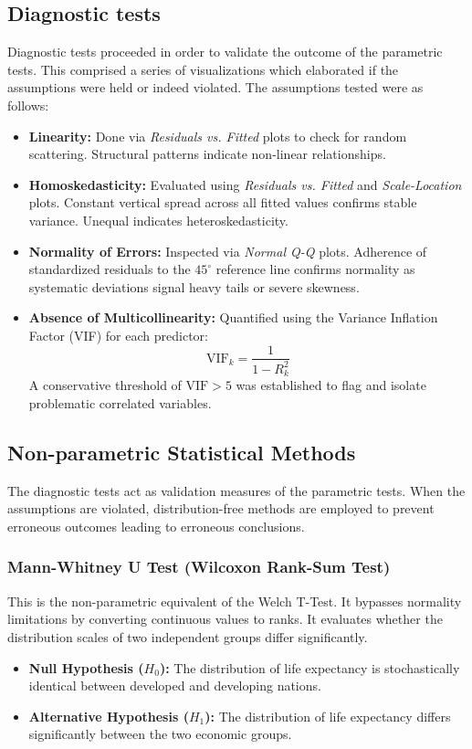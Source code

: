 \documentclass[3pt, a4paper]{article}
\begin{document}
\subsection{Diagnostic tests}
Diagnostic tests proceeded in order to validate the outcome of the parametric tests. This comprised a series of visualizations which elaborated if the assumptions were held or indeed violated. The assumptions tested were as follows:
\begin{itemize}[noitemsep,topsep=0pt]
    \item \textbf{Linearity:} Done via \textit{Residuals vs. Fitted} plots to check for random scattering. Structural patterns indicate non-linear relationships.
    \item \textbf{Homoskedasticity:} Evaluated using \textit{Residuals vs. Fitted} and \textit{Scale-Location} plots. Constant vertical spread across all fitted values confirms stable variance. Unequal indicates heteroskedasticity.
    \item \textbf{Normality of Errors:} Inspected via \textit{Normal Q-Q} plots. Adherence of standardized residuals to the $45^\circ$ reference line confirms normality as systematic deviations signal heavy tails or severe skewness.
    \item \textbf{Absence of Multicollinearity:} Quantified using the Variance Inflation Factor (VIF) for each predictor:
    $$\text{VIF}_k = \frac{1}{1 - R_k^2}$$
    A conservative threshold of $\text{VIF} > 5$ was established to flag and isolate problematic correlated variables.
\end{itemize}

\subsection{Non-parametric Statistical Methods}
The diagnostic tests act as validation measures of the parametric tests. When the assumptions are violated, distribution-free methods are employed to prevent erroneous outcomes leading to erroneous conclusions.

\subsubsection{Mann-Whitney U Test (Wilcoxon Rank-Sum Test)}
This is the non-parametric equivalent of the Welch T-Test. It bypasses normality limitations by converting continuous values to ranks. It evaluates whether the distribution scales of two independent groups differ significantly.
\begin{itemize}[noitemsep,topsep=0pt]
    \item \textbf{Null Hypothesis ($H_0$):} The distribution of life expectancy is stochastically identical between developed and developing nations.
    \item \textbf{Alternative Hypothesis ($H_1$):} The distribution of life expectancy differs significantly between the two economic groups.
\end{itemize}
\end{document}
